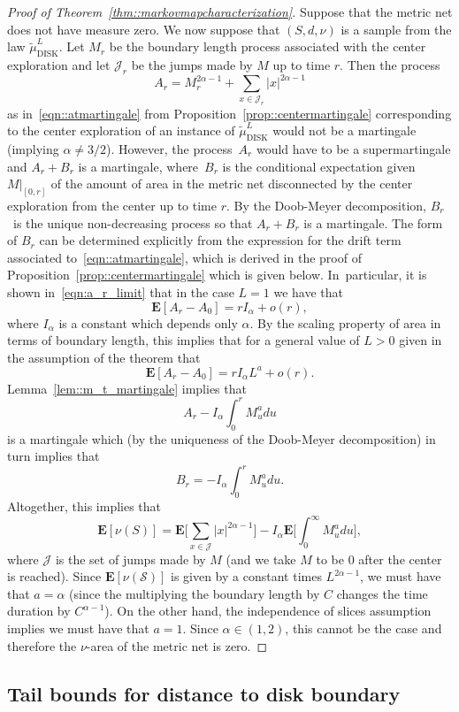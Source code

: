 \documentclass[JEP,XML,SOM,Unicode]{cedram}
\let\mathcal\mathscr
\theoremstyle{plain}
\numberwithin{theorem}{section}
\theoremstyle{definition}
\newcommand{\CS}{{\mathcal S}}
\newcommand{\CJ}{{\mathcal J}}
\newcommand \E {{\mathbf E}}
\newcommand{\tmudl}{\wt{\mu}_{\mathrm{DISK}}^L}
\let\wt\widetilde
\begin{document}
\begin{proof}[Proof of Theorem~\ref{thm::markovmapcharacterization}]
Suppose that the metric net does not have measure zero. We now suppose that $(S,d,\nu)$ is a sample from the law $\tmudl$. Let $M_r$ be the boundary length process associated with the center exploration and let $\CJ_r$ be the jumps made by $M$ up to time $r$. Then the process
\[
A_r = M_r^{2\alpha-1} + \sum_{x \in \CJ_r} |x|^{2\alpha-1}
\]
as in~\eqref{eqn::atmartingale} from Proposition~\ref{prop::centermartingale} corresponding to the center exploration of an instance of $\tmudl$ would not be a martingale (implying $\alpha \neq 3/2$). However, the process~$A_r$ would have to be a supermartingale and $A_r + B_r$ is a martingale, where~$B_r$ is the conditional expectation given $M|_{[0,r]}$ of the amount of area in the metric net disconnected by the center exploration from the center up to time $r$. By the Doob-Meyer decomposition, $B_r$~is the unique non-decreasing process so that $A_r + B_r$ is a martingale. The form of $B_r$ can be determined explicitly from the expression for the drift term associated to~\eqref{eqn::atmartingale}, which is derived in the proof of Proposition~\ref{prop::centermartingale} which is given below. In~particular, it is shown in~\eqref{eqn:a_r_limit} that in the case $L=1$ we have that
\[
\E[ A_r - A_0] = r I_\alpha + o(r),
\]
where $I_\alpha$ is a constant which depends only $\alpha$. By the scaling property of area in terms of boundary length, this implies that for a general value of $L > 0$ given in the assumption of the theorem that
\[
\E[ A_r - A_0] = r I_\alpha L^a + o(r).
\]
Lemma~\ref{lem::m_t_martingale} implies that
\[
A_r - I_\alpha \int_0^r M_u^a du
\]
is a martingale which (by the uniqueness of the Doob-Meyer decomposition) in turn implies that
\[
B_r = -I_\alpha \int_0^r M_u^a du.
\]
Altogether, this implies that
\[
\E[ \nu(S) ] = \E\biggl[ \sum_{x \in \CJ} |x|^{2\alpha-1} \biggr] - I_\alpha \E\biggl[ \int_0^\infty M_u^a du \biggr],
\]
where $\CJ$ is the set of jumps made by $M$ (and we take $M$ to be $0$ after the center is reached). Since $\E[ \nu(\CS) ]$ is given by a constant times $L^{2\alpha-1}$, we must have that $a = \alpha$ (since the multiplying the boundary length by $C$ changes the time duration by $C^{\alpha-1}$). On the other hand, the independence of slices assumption implies we must have that $a=1$. Since $\alpha \in (1,2)$, this cannot be the case and therefore the $\nu$-area of the metric net is zero.
\end{proof}

\subsection{Tail bounds for distance to disk boundary}
\label{subsec::tail_bounds}
\end{document}
